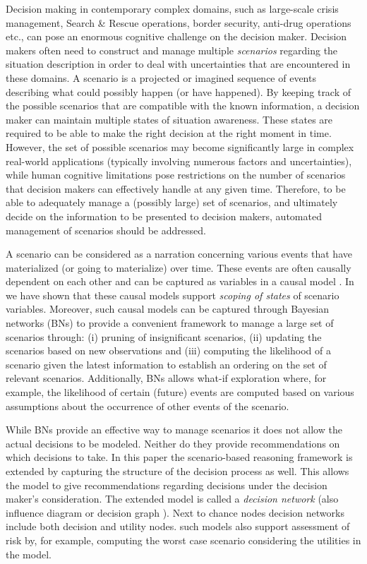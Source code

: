 \documentclass[conference]{IEEEtran}
\begin{document}
Decision making in contemporary complex domains, such as large-scale crisis management, Search \& Rescue operations, border security, anti-drug operations etc., can pose an enormous cognitive challenge on the decision maker. Decision makers often need to construct and manage multiple {\em scenarios} regarding the situation description in order to deal with uncertainties that are encountered in these domains. A scenario is a projected or imagined sequence of events describing what could possibly happen (or have happened). By keeping track of the possible scenarios that are compatible with the known information, a decision maker can maintain multiple states of situation awareness. These states are required to be able to make the right decision at the right moment in time. However, the set of possible scenarios may become significantly large in complex real-world applications (typically involving numerous factors and uncertainties), while human cognitive limitations pose restrictions on the number of scenarios that decision makers can effectively handle at any given time. Therefore, to be able to adequately manage a (possibly large) set of scenarios, and  ultimately decide on the information to be presented to decision makers, automated management of scenarios should be addressed.

A scenario can be considered as a narration concerning various events that have materialized (or going to materialize) over time. These events are often causally dependent on each other and can be captured as variables in a causal model \cite{pearl00book}. In \cite{conrado14if} we have shown that these causal models support {\em scoping of states} of scenario variables. Moreover, such causal models can be captured through Bayesian networks (BNs) \cite{pearl88book, jensen07book} to provide a convenient framework to manage a large set of scenarios through: (i) pruning of insignificant scenarios, (ii) updating the scenarios based on new observations and (iii) computing the likelihood of a scenario given the latest information to establish an ordering on the set of relevant scenarios. Additionally, BNs allows what-if exploration where, for example, the likelihood of certain (future) events are computed based on various assumptions about the occurrence of other events of the scenario.

While BNs provide an effective way to manage scenarios it does not allow the actual decisions to be modeled. Neither do they provide recommendations on which decisions to take. In this paper the scenario-based reasoning framework is extended by capturing the structure of the decision process as well. This allows the model to give recommendations regarding decisions under the decision maker's consideration. The extended model is called a {\em decision network} \cite{russell02bn} (also influence diagram or decision graph \cite{jensen07book}). Next to chance nodes decision networks include both decision and utility nodes. such models also support assessment of risk by, for example, computing the worst case scenario considering the utilities in the model.
\end{document}
